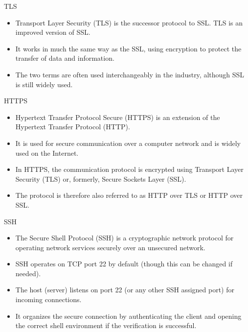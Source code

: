 \begin{frame}[fragile]{TLS}

\begin{itemize}
	\item Transport Layer Security (TLS) is the successor protocol to SSL. TLS is an improved version of SSL. 
	\item It works in much the same way as the SSL, using encryption to protect the transfer of data and information. 
	\item The two terms are often used interchangeably in the industry, although SSL is still widely used.
\end{itemize}

\end{frame}

\begin{frame}[fragile]{HTTPS}

\begin{itemize}
	\item Hypertext Transfer Protocol Secure (HTTPS) is an extension of the Hypertext Transfer Protocol (HTTP). 
	\item It is used for secure communication over a computer network and is widely used on the Internet.
	\item In HTTPS, the communication protocol is encrypted using Transport Layer Security (TLS) or, formerly, Secure Sockets Layer (SSL). 
	\item The protocol is therefore also referred to as HTTP over TLS or HTTP over SSL.
\end{itemize}

\end{frame}

\begin{frame}[fragile]{SSH}
\begin{itemize}
	\item The Secure Shell Protocol (SSH) is a cryptographic network protocol for operating network services securely over an unsecured network.
	\item SSH operates on TCP port 22 by default (though this can be changed if needed). 
	\item The host (server) listens on port 22 (or any other SSH assigned port) for incoming connections. 
	\item It organizes the secure connection by authenticating the client and opening the correct shell environment if the verification is successful.
\end{itemize}
\end{frame}


